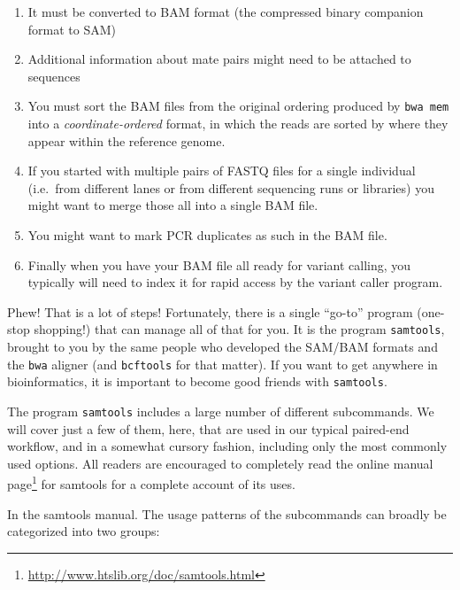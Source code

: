 \documentclass[]{krantz}
\providecommand{\tightlist}{%
  \setlength{\itemsep}{0pt}\setlength{\parskip}{0pt}}
\renewcommand{\href}[2]{#2\footnote{\url{#1}}}
\begin{document}
\begin{enumerate}
\def\labelenumi{\arabic{enumi}.}
\tightlist
\item
  It must be converted to BAM format (the compressed binary companion format to SAM)
\item
  Additional information about mate pairs might need to be attached to sequences
\item
  You must sort the BAM files from the original ordering produced by \texttt{bwa\ mem} into a
  \emph{coordinate-ordered} format, in which the reads are sorted by where they appear within the
  reference genome.
\item
  If you started with multiple pairs of FASTQ files for a single individual (i.e.~from different lanes
  or from different sequencing runs or libraries) you might want to merge those all into a single BAM
  file.
\item
  You might want to mark PCR duplicates as such in the BAM file.
\item
  Finally when you have your BAM file all ready for variant calling, you typically
  will need to index it for rapid access by the variant caller program.
\end{enumerate}

Phew! That is a lot of steps! Fortunately, there is a single ``go-to'' program (one-stop shopping!)
that can manage all of that for you. It is the program \texttt{samtools}, brought to you by the
same people who developed the SAM/BAM formats \citep{liSequenceAlignmentMap2009} and the \texttt{bwa} aligner
(and \texttt{bcftools} for that matter). If you want to get anywhere in bioinformatics, it is
important to become good friends with \texttt{samtools}.

The program \texttt{samtools} includes a large number of different subcommands.
We will cover just a few of them, here, that are used in our typical paired-end workflow,
and in a somewhat cursory fashion, including only the most commonly used options.
All readers are encouraged to completely read the online \href{http://www.htslib.org/doc/samtools.html}{manual page}
for samtools for a complete account of its uses.

In the samtools manual. The usage patterns of the subcommands can broadly be categorized into
two groups:
\end{document}
